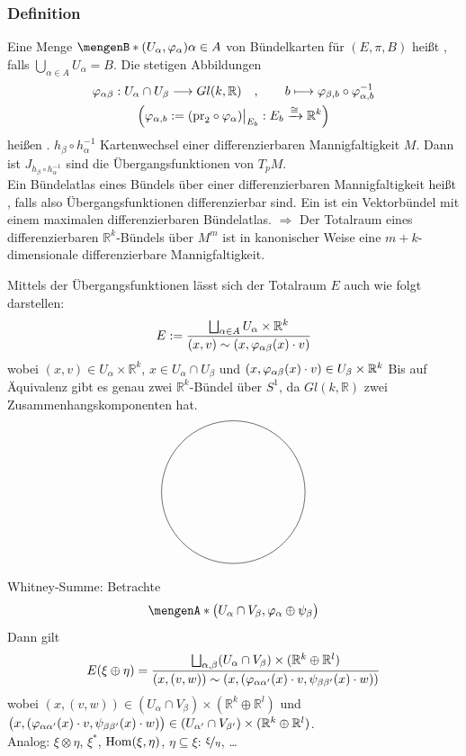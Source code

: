 \subsubsection[Definition: Bündelatlas]{Definition} %
\label{ssub:438}
Eine Menge $\set[(U_\alpha, \varphi_\alpha)]{\alpha \in A}$ von Bündelkarten für $(E,\pi ,B)$ heißt , falls $\bigcup_{\alpha \in A} U_\alpha = B$.
Die stetigen Abbildungen
\begin{gather}
	\varphi_{\alpha \beta} : U_\alpha \cap U_\beta \longrightarrow Gl(k,\mathds{R}) \quad, \qquad b \longmapsto \varphi_{\beta,b} \circ \varphi_{\alpha,b} ^{-1} \\
	 \enbrace*{ \varphi_{\alpha, b} := (\mathrm{pr}_2 \circ \varphi_\alpha)\big|_{E_b} : E_b \xrightarrow{\cong} \mathds{R}^k } 
\end{gather}
heißen .
$h_\beta \circ  h_\alpha ^{-1}$ Kartenwechsel einer differenzierbaren Mannigfaltigkeit $M$. Dann ist $J_{h_\beta \circ h_\alpha ^{-1}}$ sind die Übergangsfunktionen von
$T_p M$. \medskip\\
Ein Bündelatlas eines Bündels über einer differenzierbaren Mannigfaltigkeit heißt , falls also Übergangsfunktionen 
differenzierbar sind. Ein  ist ein Vektorbündel mit einem maximalen differenzierbaren Bündelatlas.
$\Rightarrow$ Der Totalraum eines differenzierbaren $\mathds{R}^k$-Bündels über $M^m$ ist in kanonischer Weise eine $m+k$-dimensionale differenzierbare Mannigfaltigkeit.

Mittels der Übergangsfunktionen lässt sich der Totalraum $E$ auch wie folgt darstellen:
\[
	E := \frac{\bigsqcup_{\alpha \in A} U_\alpha \times \mathds{R}^k}{(x,v) \sim \enbrace*{x, \varphi_{\alpha \beta}(x) \cdot v}} 
\]
wobei $(x,v) \in U_\alpha \times \mathds{R}^k$, $x\in U_\alpha \cap U_\beta$ und $\enbrace*{x, \varphi_{\alpha \beta}(x) \cdot v} \in U_\beta \times \mathds{R}^k$
Bis auf Äquivalenz gibt es genau zwei $\mathds{R}^k$-Bündel über $S^1$, da $Gl(k,\mathds{R})$ zwei Zusammenhangskomponenten hat.
\[
	\begin{tikzpicture}
		\draw (0,0) circle[radius=2];
	\end{tikzpicture}
\]
Whitney-Summe: Betrachte
\[
	\set{\enbrace[\big]{U_\alpha \cap V_\beta, \varphi_\alpha \oplus \psi_\beta}} 
\]
Dann gilt
\[
	E(\xi \oplus  \eta) = \frac{\bigsqcup_{\alpha,\beta} (U_\alpha \cap V_\beta) \times (\mathds{R}^k  \oplus  \mathds{R}^l)}{(x,(v,w)) \sim \enbrace*{x,
	\enbrace*{\varphi_{\alpha \alpha'}(x) \cdot v, \psi_{\beta \beta'}(x) \cdot w} } } 
\]
wobei $(x,(v,w)) \in (U_\alpha \cap V_\beta) \times (\mathds{R}^k \oplus \mathds{R}^l) $ und $\enbrace[\big]{x,\enbrace*{\varphi_{\alpha \alpha'}(x) \cdot v, 
\psi_{\beta \beta'}(x) \cdot w} } \in (U_{\alpha'} \cap V_{\beta'}) \times (\mathds{R}^k \oplus \mathds{R}^l)$. \medskip \\
Analog: $\xi \otimes  \eta$, $\xi^*$, $\Hom(\xi, \eta)$, $\eta \subseteq \xi$: $\nicefrac{\xi}{\eta}$, \ldots 
\newpage

